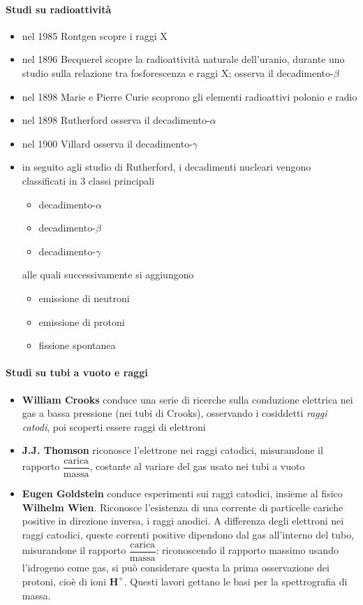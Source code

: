\paragraph{Studi su radioattività}
\begin{itemize}
    \item nel 1985 Rontgen scopre i raggi X
    \item nel 1896 Becquerel scopre la radioattività naturale dell'uranio, durante uno studio sulla relazione tra fosforescenza e raggi X; osserva il decadimento-$\beta$
    \item nel 1898 Marie e Pierre Curie scoprono gli elementi radioattivi polonio e radio
    \item nel 1898 Rutherford osserva il decadimento-$\alpha$
    \item nel 1900 Villard osserva il decadimento-$\gamma$
    \item in seguito agli studio di Rutherford, i decadimenti nucleari vengono classificati in 3 classi principali
        \begin{itemize}
            \item decadimento-$\alpha$
            \item decadimento-$\beta$
            \item decadimento-$\gamma$
        \end{itemize}
        alle quali successivamente si aggiungono
        \begin{itemize}
            \item emissione di neutroni
            \item emissione di protoni
            \item fissione spontanea
        \end{itemize}
\end{itemize}

\paragraph{Studi su tubi a vuoto e raggi}
\begin{itemize}
    \item \textbf{William Crooks} conduce una serie di ricerche sulla conduzione elettrica nei gas a bassa pressione (nei tubi di Crooks), osservando i cosiddetti \textit{raggi catodi}, poi scoperti essere raggi di elettroni
    \item \textbf{J.J. Thomson} riconosce l'elettrone nei raggi catodici, misurandone il rapporto $\dfrac{\text{carica}}{\text{massa}}$, costante al variare del gas usato nei tubi a vuoto
    \item \textbf{Eugen Goldstein} conduce esperimenti sui raggi catodici, insieme al fisico \textbf{Wilhelm Wien}. Riconosce l'esistenza di una corrente di particelle cariche positive in direzione inversa, i raggi anodici. A differenza degli elettroni nei raggi catodici, queste correnti positive dipendono dal gas all'interno del tubo, misurandone il rapporto $\dfrac{\text{carica}}{\text{massa}}$: riconoscendo il rapporto massimo usando l'idrogeno come gas, si può considerare questa la prima osservazione dei protoni, cioè di ioni $\textbf{H}^+$. Questi lavori gettano le basi per la spettrografia di massa.
\end{itemize}

